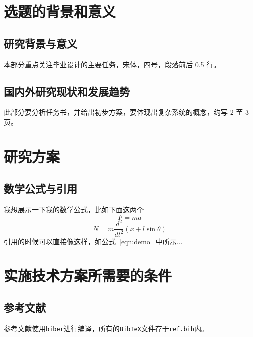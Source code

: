 \documentclass[UTF8,AutoFakeBold,AutoFakeSlant,zihao=-4]{ctexart}
\begin{document}
\section{选题的背景和意义}
\begin{ubox}
\subsection{研究背景与意义}
本部分重点关注毕业设计的主要任务，宋体，四号，段落前后 0.5 行。

\subsection{国内外研究现状和发展趋势}
此部分要分析任务书，并给出初步方案，要体现出复杂系统的概念，约写 2 至 3 页。
\end{ubox}



\newpage
\section{研究方案}
\begin{ubox}
\subsection{数学公式与引用}

我想展示一下我的数学公式，比如下面这两个
\begin{equation}\label{eqn:demo}
	F = ma
\end{equation}
\begin{equation}
	N=m \frac{d^{2}}{d t^{2}}(x+l \sin \theta)
\end{equation}
引用的时候可以直接像这样，如公式~\ref{eqn:demo}~中所示...


\subsection{}
\end{ubox}

\newpage
\section{实施技术方案所需要的条件}
\begin{ubox}
\subsection{参考文献}

参考文献使用\texttt{biber}进行编译，所有的\texttt{BibTeX}文件存于\texttt{ref.bib}内。
\subsection{}
\end{ubox}
\end{document}
